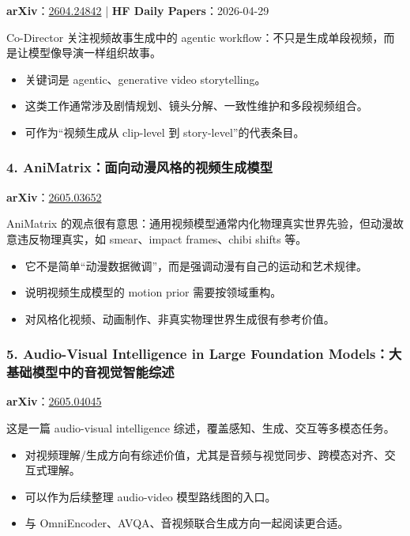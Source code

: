 \textbf{arXiv}：\href{https://arxiv.org/abs/2604.24842}{2604.24842} | \textbf{HF Daily Papers}：2026-04-29

Co-Director 关注视频故事生成中的 agentic workflow：不只是生成单段视频，而是让模型像导演一样组织故事。

\begin{itemize}[leftmargin=1.5em]
  \item 关键词是 agentic、generative video storytelling。
  \item 这类工作通常涉及剧情规划、镜头分解、一致性维护和多段视频组合。
  \item 可作为“视频生成从 clip-level 到 story-level”的代表条目。
\end{itemize}

\subsubsection{4. AniMatrix：面向动漫风格的视频生成模型}

\textbf{arXiv}：\href{https://arxiv.org/abs/2605.03652}{2605.03652}

AniMatrix 的观点很有意思：通用视频模型通常内化物理真实世界先验，但动漫故意违反物理真实，如 smear、impact frames、chibi shifts 等。

\begin{itemize}[leftmargin=1.5em]
  \item 它不是简单“动漫数据微调”，而是强调动漫有自己的运动和艺术规律。
  \item 说明视频生成模型的 motion prior 需要按领域重构。
  \item 对风格化视频、动画制作、非真实物理世界生成很有参考价值。
\end{itemize}

\subsubsection{5. Audio-Visual Intelligence in Large Foundation Models：大基础模型中的音视觉智能综述}

\textbf{arXiv}：\href{https://arxiv.org/abs/2605.04045}{2605.04045}

这是一篇 audio-visual intelligence 综述，覆盖感知、生成、交互等多模态任务。

\begin{itemize}[leftmargin=1.5em]
  \item 对视频理解/生成方向有综述价值，尤其是音频与视觉同步、跨模态对齐、交互式理解。
  \item 可以作为后续整理 audio-video 模型路线图的入口。
  \item 与 OmniEncoder、AVQA、音视频联合生成方向一起阅读更合适。
\end{itemize}

